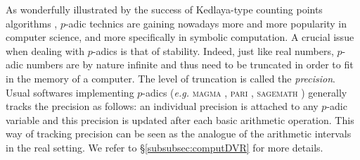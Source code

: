 \documentclass{jT}
\numberwithin{equation}{section}
\theoremstyle{definition}
\begin{document}
As wonderfully illustrated by the success of Kedlaya-type counting 
points algorithms \cite{kedlaya}, $p$-adic technics are gaining nowadays 
more and more popularity in computer science, and more specifically in 
symbolic computation. A crucial issue when dealing with $p$-adics is 
that of stability. Indeed, just like real numbers, $p$-adic numbers are 
by nature infinite and thus need to be truncated in order to fit in the 
memory of a computer. The level of truncation is called the 
\emph{precision}. Usual softwares implementing $p$-adics (\emph{e.g.} 
\textsc{magma} \cite{magma}, \textsc{pari} \cite{pari}, \textsc{sagemath} 
\cite{sage}) generally tracks the precision as follows: an individual 
precision is attached to any $p$-adic variable and this precision is 
updated after each basic arithmetic operation. This way of tracking 
precision can be seen as the analogue of the arithmetic intervals in the 
real setting. We refer to \S \ref{subsubsec:computDVR} for more details.
\end{document}
